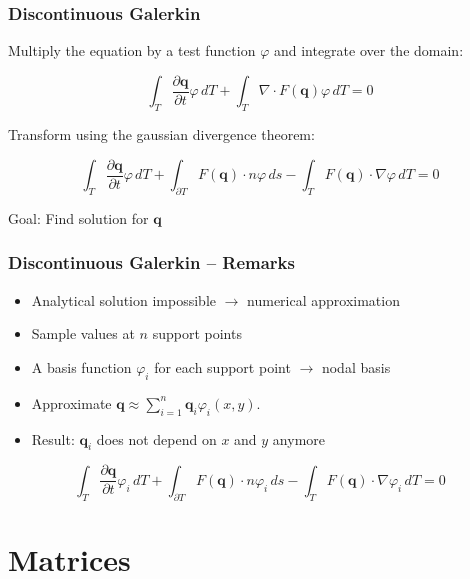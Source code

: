 \documentclass{beamer}
\newcommand{\pd}[2]{\dfrac{\partial #1}{\partial #2}}
\renewcommand{\phi}{\varphi}
\begin{document}
\begin{frame}
  \frametitle{Discontinuous Galerkin}
  Multiply the equation by a test function $\phi$ and integrate over the domain:
  
  \begin{equation}
    \label{eq:shallow-water-weak-form}
    \int_T \pd {\mathbf{q}}{t} \phi \, dT + \int_T \nabla \cdot F(\mathbf{q}) \phi \, dT = 0
  \end{equation}

  Transform using the gaussian divergence theorem:

  \begin{equation}
    \label{eq:shallow-water-dg}
    \int_T \pd {\mathbf{q}}{t} \phi \, dT +
    \int_{\partial T} F(\mathbf{q}) \cdot n \phi \, ds -
    \int_T F(\mathbf{q}) \cdot \nabla \phi \, dT = 0
  \end{equation}
  
  Goal: Find solution for $\mathbf{q}$
\end{frame}

\begin{frame}
  \frametitle{Discontinuous Galerkin -- Remarks}
  \begin{itemize}
  \item Analytical solution impossible $\rightarrow$ numerical approximation
  \item Sample values at $n$ support points
  \item A basis function $\phi_i$ for each support point $\rightarrow$ nodal basis
  \item Approximate 
    $\mathbf{q} \approx \sum_{i=1}^n \mathbf{q}_i \phi_i(x,y)$.
  \item Result: $\mathbf{q}_i$ does not depend on $x$ and $y$ anymore
  \end{itemize}

  \begin{equation}
    \label{eq:shallow-water-phi-i}
    \int_T \pd {\mathbf{q}}{t} \phi_i \, dT +
    \int_{\partial T} F(\mathbf{q}) \cdot n \phi_i \, ds -
    \int_T F(\mathbf{q}) \cdot \nabla \phi_i \, dT = 0
  \end{equation}
\end{frame}

\section{Matrices}
\end{document}
